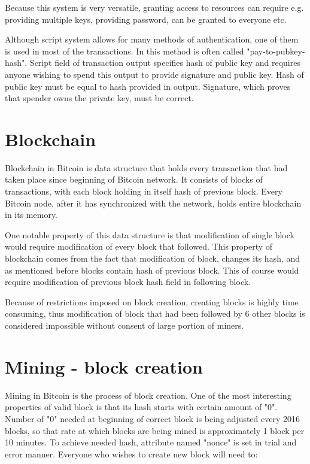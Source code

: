\documentclass[12pt, en, eng, oneside]{mgr}
\begin{document}
Because this system is very versatile, granting access to resources can require e.g. providing multiple keys, providing password, can be granted to everyone etc. 

Although script system allows for many methods of authentication, one of them is used in most of the transactions. In this method is often called "pay-to-pubkey-hash". Script field of transaction output specifies hash of public key and requires anyone wishing to spend this output to provide signature and public key. Hash of public key must be equal to hash provided in output. Signature, which proves that spender owns the private key, must be correct.


\section{Blockchain}
Blockchain in Bitcoin is data structure that holds every transaction that had taken place since beginning of Bitcoin network. It consists of blocks of transactions, with each block holding in itself hash of previous block. Every Bitcoin node, after it has synchronized with the network, holds entire blockchain in its memory.

One notable property of this data structure is that modification of single block would require modification of every block that followed. This property of blockchain comes from the fact that modification of block, changes its hash, and as mentioned before blocks contain hash of previous block. This of course would require modification of previous block hash field in following block. 

Because of restrictions imposed on block creation, creating blocks is highly time consuming, thus modification of block that had been followed by 6 other blocks is considered impossible without consent of large portion of miners.

\section{Mining - block creation}
Mining in Bitcoin is the process of block creation. One of the most interesting properties of valid block is that its hash starts with certain amount of "0". Number of "0" needed at beginning of correct block is being adjusted every 2016 blocks, so that rate at which blocks are being mined is approximately 1 block per 10 minutes. To achieve needed hash, attribute named "nonce" is set in trial and error manner. Everyone who wishes to create new block will need to:
\end{document}
